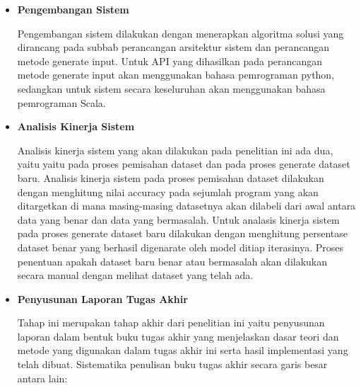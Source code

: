 \begin{itemize}[topsep=0pt]
  \item \textbf{Pengembangan Sistem}
  

  Pengembangan sistem dilakukan dengan menerapkan algoritma
  solusi yang dirancang pada subbab perancangan arsitektur
  sistem dan perancangan metode generate input. Untuk API
  yang dihasilkan pada perancangan metode generate input
  akan menggunakan bahasa pemrograman python, sedangkan
  untuk sistem secara keseluruhan akan menggunakan bahasa
  pemrograman Scala. 

  \item \textbf{Analisis Kinerja Sistem}
  
  Analisis kinerja sistem yang akan dilakukan pada penelitian ini ada dua, yaitu yaitu pada proses pemisahan dataset dan pada proses generate dataset baru. Analisis kinerja sistem pada proses pemisahan dataset dilakukan dengan menghitung nilai accuracy pada sejumlah program yang akan ditargetkan di mana masing-masing datasetnya akan dilabeli dari awal antara data yang benar dan data yang bermasalah. Untuk analasis kinerja sistem pada proses generate dataset baru dilakukan dengan menghitung persentase dataset benar yang berhasil digenarate oleh model ditiap iterasinya. Proses penentuan apakah dataset baru benar atau bermasalah akan dilakukan secara manual dengan melihat dataset yang telah ada.

  \item \textbf{Penyusunan Laporan Tugas Akhir}
  
  Tahap ini merupakan tahap akhir dari penelitian ini yaitu penyusunan laporan dalam bentuk buku tugas akhir yang menjelaskan dasar teori dan metode yang digunakan dalam tugas akhir ini serta hasil implementasi yang telah dibuat. Sistematika penulisan buku tugas akhir secara garis besar antara lain:


\end{itemize}

